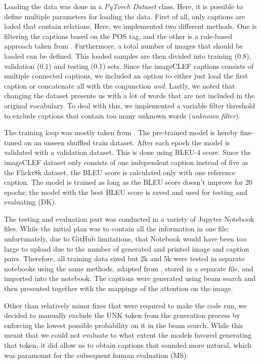 \documentclass[11pt]{article}
\begin{document}
Loading the data was done in a \emph{PyTorch Dataset} class. Here, it is possible to define multiple parameters for loading the data. First of all, only captions are loded that contain relations. Here, we implemented two different methods. One is filtering the captions based on the POS tag, and the other is a rule-based approach taken from \cite{Ghanimifard2018}. Furthermore, a total number of images that should be loaded can be defined. This loaded samples are then divided into training (0.8), validation (0.1) and testing (0.1) sets. Since the imageCLEF captions consists of multiple connected captions, we included an option to either just load the first caption or concatenate all with the conjunction \emph{and}. Lastly, we noted that changing the dataset presents us with a lot of words that are not included in the original vocabulary. To deal with this, we implemented a variable filter threshold to exclude captions that contain too many unknown words (\emph{unknown filter}).

The training loop was mostly taken from \cite{ilinykh}. The pre-trained model is hereby fine-tuned on an unseen shuffled train dataset. After each epoch the model is validated with a validation dataset. This is done using BLEU-4 score. Since the imageCLEF dataset only consists of one independent caption instead of five as the Flickr8k dataset, the BLEU score is calculated only with one reference caption. The model is trained as long as the BLEU score doesn't improve for 20 epochs; the model with the best BLEU score is saved and used for testing and evaluating (DK).

The testing and evaluation part was conducted in a variety of Jupyter Notebook files. While the initial plan was to contain all the information in one file; unfortunately, due to GitHub limitations, that Notebook would have been too large to upload due to the number of generated and printed image and caption pairs. Therefore, all training data sized but 2k and 5k were tested in separate notebooks using the same methods, adapted from \cite{ilinykh}, stored in a separate file, and imported into the notebook. The captions were generated using beam search and then presented together with the mappings of the attention on the image.

Other than relatively minor fixes that were required to make the code run, we decided to manually exclude the UNK token from the generation process by enforcing the lowest possible probability on it in the beam search. While this meant that we could not evaluate to what extent the models favored generating that token, it did allow us to obtain captions that sounded more natural, which was paramount for the subsequent human evaluation (MS).
\end{document}
